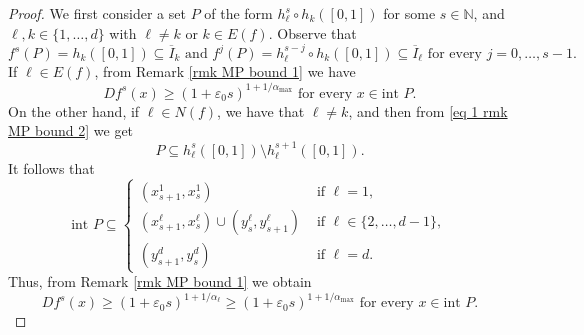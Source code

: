 \documentclass[12pt]{amsart}
\numberwithin{equation}{section} %
\numberwithin{figure}{section} %
\theoremstyle{plain}
\theoremstyle{definition}
\theoremstyle{remark}
\theoremstyle{citing}
\newcommand{\N}{\mathbb{N}}
\renewcommand{\=}{\coloneqq}
\begin{document}
\begin{proof}
    We first consider a set $P$ of the form  $h_\ell^s\circ h_k([0,1])$ for some $s\in\N$, and $\ell,k \in \{1,\ldots,d\}$ with $\ell\neq k$ or $k\in E(f)$.  Observe that
    \begin{equation}\label{eq 1 rmk MP bound 2}
        f^s(P)= h_k([0,1])\subseteq \overline{I}_k \text{ and } f^j(P)= h^{s-j}_{\ell}\circ h_k([0,1])\subseteq \overline{I}_\ell \text{ for every }j=0,\ldots,s-1.
    \end{equation}
    If $\ell\in E(f)$, from Remark \ref{rmk MP bound 1} we have 
    \begin{equation}\label{eq bound for Df^s E(f)}
        Df^s(x) \geq (1+\varepsilon_0 s)^{1+1/\alpha_{\max}}\text{ for every } x\in \text{int } P.
    \end{equation}
    On the other hand, if $\ell\in N(f)$, we have that $\ell\neq k$, and then from \eqref{eq 1 rmk MP bound 2} we get
    \begin{equation*}
        P \subseteq h_{\ell}^s([0,1])\setminus h_{\ell}^{s+1}([0,1]).
    \end{equation*}
    It follows that
    \begin{equation}\label{eq lower bound Df^s}
        \text{int }P\subseteq 
        \begin{cases}
            (x_{s+1}^1, x_s^1)& \text{ if } \ell=1,\\
            (x_{s+1}^\ell, x_s^\ell)\cup(y_s^\ell, y_{s+1}^\ell) & \text{ if } \ell\in \{2,\ldots,d-1\},\\
            (y_{s+1}^d, y_s^d) & \text{ if } \ell=d.
        \end{cases}
    \end{equation}
    Thus, from Remark \ref{rmk MP bound 1} we obtain
    \begin{equation}\label{eq 2 rmk MP bound 2}
         Df^s(x) \geq (1+\varepsilon_0 s)^{1+1/\alpha_\ell}  \geq (1+\varepsilon_0 s)^{1+1/\alpha_{\max}} \text{ for every } x\in \text{int }P.
    \end{equation}


\end{proof}
\end{document}
